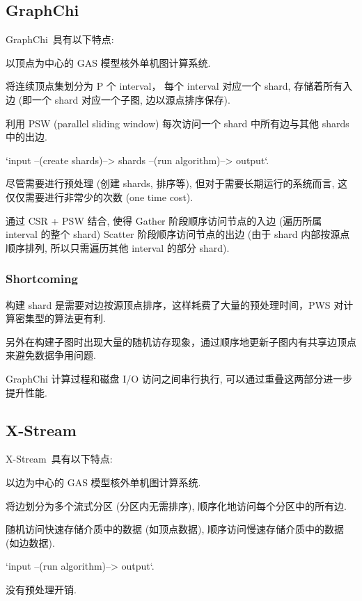 \documentclass[UTF8,12pt,a4paper]{article}
\begin{document}
\subsection{GraphChi}
GraphChi~\cite{DBLP:conf/osdi/KyrolaBG12}具有以下特点:
\begin{compactitem}
  \item 以顶点为中心的 GAS 模型核外单机图计算系统.
  \item 将连续顶点集划分为 P 个 interval， 每个 interval 对应一个 shard,
  存储着所有入边 (即一个 shard 对应一个子图, 边以源点排序保存).
  \item 利用 PSW (parallel sliding window) 每次访问一个 shard 中所有边与其他 shards 中的出边.
  \item `input --(create shards)--> shards --(run algorithm)--> output`.
  \item 尽管需要进行预处理 (创建 shards, 排序等), 但对于需要长期运行的系统而言, 这仅仅需要进行非常少的次数 (one time cost).
  \item 通过 CSR + PSW 结合, 使得 Gather 阶段顺序访问节点的入边 (遍历所属 interval 的整个 shard)
  Scatter 阶段顺序访问节点的出边 (由于 shard 内部按源点顺序排列, 所以只需遍历其他 interval 的部分 shard).
\end{compactitem}
\subsubsection{Shortcoming}
\begin{compactitem}
  \item 构建 shard 是需要对边按源顶点排序，这样耗费了大量的预处理时间，PWS 对计算密集型的算法更有利.
  \item 另外在构建子图时出现大量的随机访存现象，通过顺序地更新子图内有共享边顶点来避免数据争用问题.
  \item GraphChi 计算过程和磁盘 I/O 访问之间串行执行, 可以通过重叠这两部分进一步提升性能.
\end{compactitem}

\subsection{X-Stream}
X-Stream~\cite{DBLP:conf/sosp/RoyMZ13}具有以下特点:
\begin{compactitem}
  \item 以边为中心的 GAS 模型核外单机图计算系统.
  \item 将边划分为多个流式分区 (分区内无需排序), 顺序化地访问每个分区中的所有边.
  \item 随机访问快速存储介质中的数据 (如顶点数据), 顺序访问慢速存储介质中的数据 (如边数据).
  \item `input --(run algorithm)--> output`.
  \item 没有预处理开销.
\end{compactitem}
\end{document}

